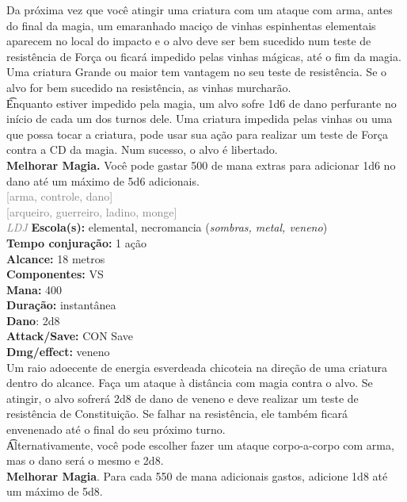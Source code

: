 \documentclass{RPG_Adventure}[2021/10/20]
\begin{document}
{\normalsize Da próxima vez que você atingir uma criatura com um ataque com arma, antes do final da magia, um emaranhado maciço de vinhas espinhentas elementais aparecem no local do impacto e o alvo deve ser bem sucedido num teste de resistência de Força ou ficará impedido pelas vinhas mágicas, até o fim da magia. Uma criatura Grande ou maior tem vantagem no seu teste de resistência. Se o alvo for bem sucedido na resistência, as vinhas murcharão.\\\t Enquanto estiver impedido pela magia, um alvo sofre 1d6 de dano perfurante no início de cada um dos turnos dele. Uma criatura impedida pelas vinhas ou uma que possa tocar a criatura, pode usar sua ação para realizar um teste de Força contra a CD da magia. Num sucesso, o alvo é libertado.\\\t \textbf{Melhorar Magia.} Você pode gastar 500 de mana extras para adicionar 1d6 no dano até um máximo de 5d6 adicionais.\\}
{\scriptsize \textcolor{gray}{[arma, controle, dano]\\}}
{\scriptsize \textcolor{gray}{[arqueiro, guerreiro, ladino, monge]\\}}
{\tiny \textcolor{gray}{\textit{LDJ}}}\jump{}
{\small \t \textbf{Escola(s):} elemental, necromancia (\textit{sombras, metal, veneno})\\\t \textbf{Tempo conjuração:} 1 ação\\\t \textbf{Alcance:} 18 metros\\\t \textbf{Componentes:} VS\\\t \textbf{Mana:} 400\\\t \textbf{Duração:} instantânea\\\t \textbf{Dano}: 2d8\\\t \textbf{Attack/Save:} CON Save\\\t \textbf{Dmg/effect:} veneno\\}
{\normalsize Um raio adoecente de energia esverdeada chicoteia na direção de uma criatura dentro do alcance. Faça um ataque à distância com magia contra o alvo. Se atingir, o alvo sofrerá 2d8 de dano de veneno e deve realizar um teste de resistência de Constituição. Se falhar na resistência, ele também ficará envenenado até o final do seu próximo turno.\\\t Alternativamente, você pode escolher fazer um ataque corpo-a-corpo com arma, mas o dano será o mesmo e 2d8.\\\t \textbf{Melhorar Magia}. Para cada 550 de mana adicionais gastos, adicione 1d8 até um máximo de 5d8.\\}
\end{document}
